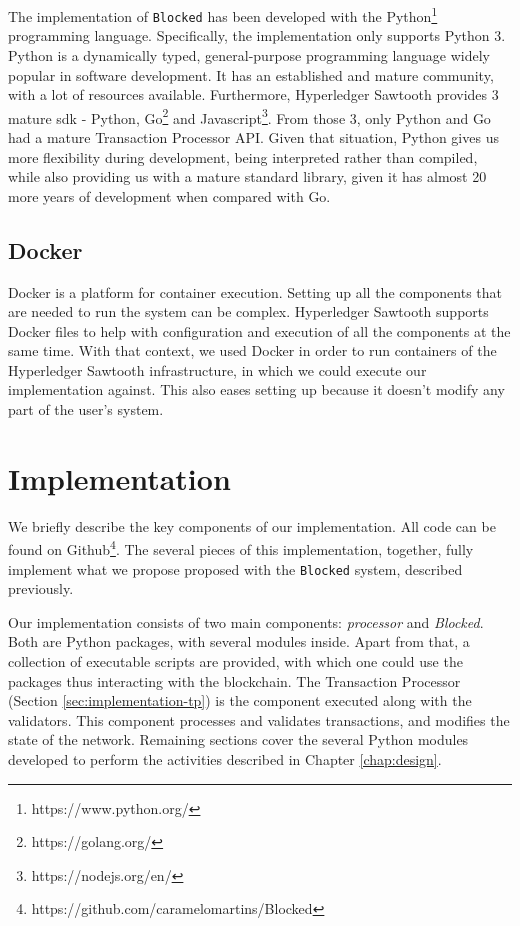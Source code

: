 The implementation of \texttt{Blocked} has been developed with the Python\footnote{https://www.python.org/} programming language. Specifically, the implementation only supports Python 3. Python is a dynamically typed, general-purpose programming language widely popular in software development. It has an established and mature community, with a lot of resources available. Furthermore, Hyperledger Sawtooth provides 3 mature \gls{sdk} - Python, Go\footnote{https://golang.org/} and Javascript\footnote{https://nodejs.org/en/}. From those 3, only Python and Go had a mature Transaction Processor API. Given that situation, Python gives us more flexibility during development, being interpreted rather than compiled, while also providing us with a mature standard library, given it has almost 20 more years of development when compared with Go.

\subsection{Docker}

Docker is a platform for container execution. Setting up all the components that are needed to run the system can be complex. Hyperledger Sawtooth supports Docker files to help with configuration and execution of all the components at the same time. With that context, we used Docker in order to run containers of the Hyperledger Sawtooth infrastructure, in which we could execute our implementation against. This also eases setting up because it doesn't modify any part of the user's system.

\section{Implementation}
\label{sec:implementation-core}

We briefly describe the key components of our implementation. All code can be found on Github\footnote{https://github.com/caramelomartins/Blocked}. The several pieces of this implementation, together, fully implement what we propose proposed with the  \texttt{Blocked} system, described previously.

Our implementation consists of two main components: \textit{processor} and \textit{Blocked}. Both are Python packages, with several modules inside. Apart from that, a collection of executable scripts are provided, with which one could use the packages thus interacting with the blockchain. The Transaction Processor (Section \ref{sec:implementation-tp}) is the component executed along with the validators. This component processes and validates transactions, and modifies the state of the network. Remaining sections cover the several Python modules developed to perform the activities described in Chapter \ref{chap:design}.

